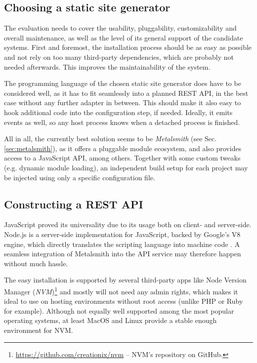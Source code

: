 \subsection{Choosing a static site generator}
\label{sec:primarythoughts-generator}

The evaluation needs to cover the usability, pluggability, customizability and overall maintenance, as well as the level of its general support of the candidate systems. First and foremost, the installation process should be as easy as possible and not rely on too many third-party dependencies, which are probably not needed afterwards. This improves the maintainability of the system.

The programming language of the chosen static site generator does have to be considered well, as it has to fit seamlessly into a planned REST API, in the best case without any further adapter in between. This should make it also easy to hook additional code into the configuration step, if needed. Ideally, it emits events as well, so any host process knows when a detached process is finished.

All in all, the currently best solution seems to be \emph{Metalsmith} (see Sec. \ref{sec:metalsmith}), as it offers a pluggable module ecosystem, and also provides access to a JavaScript API, among others. Together with some custom tweaks (e.g. dynamic module loading), an independent build setup for each project may be injected using only a specific configuration file.


\subsection{Constructing a REST API}
\label{sec:primarythoughts-restapi}

JavaScript proved its universality due to its usage both on client- and server-side. Node.js is a server-side implementation for JavaScript, backed by Google's V8 engine, which directly translates the scripting language into machine code \cite[4]{cantelon2017node}. A seamless integration of Metalsmith into the API service may therefore happen without much hassle.

The easy installation is supported by several third-party apps like Node Version Manager (\emph{NVM})\footnote{\url{https://github.com/creationix/nvm} -- NVM's repository on GitHub.} and mostly will not need any admin rights, which makes it ideal to use on hosting environments without root access (unlike PHP or Ruby for example). Although not equally well supported among the most popular operating systems, at least MacOS and Linux provide a stable enough environment for NVM.

